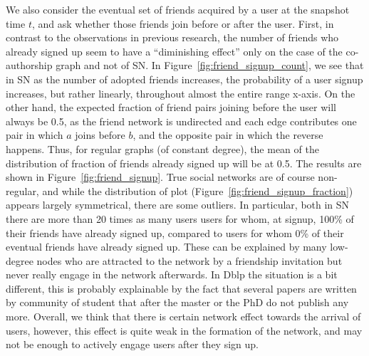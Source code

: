 \documentclass[phd,tocprelim]{cornell}
\begin{document}
We also consider the eventual set of friends acquired by a user at the snapshot time $t$, and
ask whether those friends join before or after the user.  First, in contrast to the observations in previous research\cite{Backstrom:2006}, the number of friends who already signed up seem to have a ``diminishing effect'' only on the case of the co-authorship graph and not of SN. In Figure~\ref{fig:friend_signup_count}, we see that in SN as the number of adopted friends increases, the probability of a user signup increases, but rather linearly, throughout almost the entire range x-axis. On the other hand, the expected
fraction of friend pairs joining before the user will always be 0.5, as the friend network is undirected and each edge contributes one pair in
which $a$ joins before $b$, and the opposite pair in which the reverse
happens.  Thus, for regular graphs (of constant degree), the mean of
the distribution of fraction of friends already signed up will be at
0.5.  The results are shown in Figure~\ref{fig:friend_signup}.  True
social networks are of course non-regular, and while the distribution
of plot (Figure~\ref{fig:friend_signup_fraction}) appears largely symmetrical, there are some outliers.  In particular, both in SN there are more than 20 times as many users users for whom, at
signup, 100\% of their friends have already signed up, compared to
users for whom 0\% of their eventual friends have already signed up. These can be explained by many low-degree nodes who are attracted to the network by a friendship invitation but never really engage in the network afterwards. In Dblp the situation is a bit different, this is probably explainable by the fact that several papers are written by community of student that after the master or the PhD do not publish any more. Overall, we think that there is certain network effect towards the arrival of users, however, this effect is quite weak in the formation of the network, and may not be enough to actively engage users after they sign up.


\end{document}
